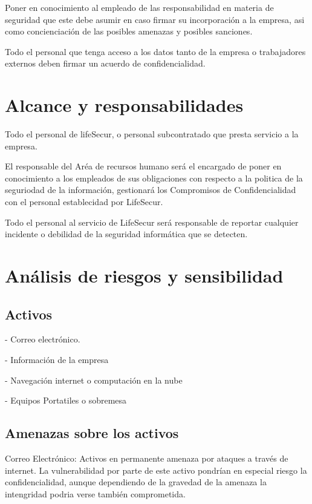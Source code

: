 \documentclass[11pt,bibtotoc,noliststotoc,BCOR0mm]{scrbook}
\begin{document}
Poner en conocimiento al empleado de las responsabilidad en materia de seguridad que este debe asumir en caso firmar su incorporación a la empresa, asi como concienciación de las posibles amenazas y posibles sanciones.

Todo el personal que tenga acceso a los datos tanto de la empresa o trabajadores externos deben firmar un acuerdo de confidencialidad.



\section{Alcance y responsabilidades}

Todo el personal de lifeSecur, o personal subcontratado que presta servicio a la empresa.

El responsable del Aréa de recursos humano será el encargado de poner en conocimiento a los empleados de sus obligaciones con respecto a la politica de  la seguriodad de la información, gestionará los Compromisos de Confidencialidad con el personal  establecidad por LifeSecur.

Todo el personal al servicio de LifeSecur será responsable de reportar cualquier incidente o debilidad de la seguridad informática que se detecten.

\section{Análisis de riesgos y sensibilidad}

\subsection{Activos}

- Correo electrónico. 

- Información de la empresa

- Navegación internet o computación en la nube

- Equipos Portatiles o sobremesa

\subsection{Amenazas sobre los activos}
Correo Electrónico: Activos en permanente amenaza por ataques a través de internet. La vulnerabilidad por parte de este activo pondrían en especial riesgo la confidencialidad, aunque dependiendo de la gravedad de la amenaza la intengridad podria verse también comprometida.
\end{document}
